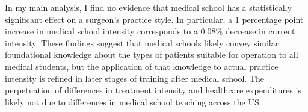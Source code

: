 In my main analysis, I find no evidence that medical school has a statistically significant effect on a surgeon's practice style. In particular, a 1 percentage point increase in medical school intensity corresponds to a 0.08\% decrease in current intensity. These findings suggest that medical schools likely convey similar foundational knowledge about the types of patients suitable for operation to all medical students, but the application of that knowledge to actual practice intensity is refined in later stages of training after medical school. The perpetuation of differences in treatment intensity and healthcare expenditures is likely not due to differences in medical school teaching across the US. 